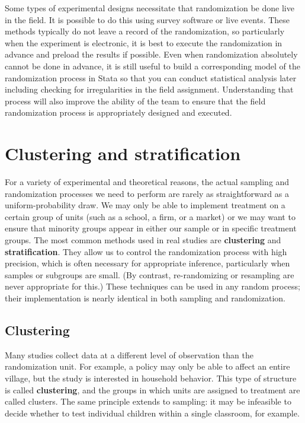 Some types of experimental designs necessitate that randomization be done live in the field.
It is possible to do this using survey software or live events.
These methods typically do not leave a record of the randomization,
so particularly when the experiment is electronic,
it is best to execute the randomization in advance and preload the results if possible.
Even when randomization absolutely cannot be done in advance, it is still useful
to build a corresponding model of the randomization process in Stata
so that you can conduct statistical analysis later
including checking for irregularities in the field assignment.
Understanding that process will also improve the ability of the team
to ensure that the field randomization process is appropriately designed and executed.


\section{Clustering and stratification}

For a variety of experimental and theoretical reasons,
the actual sampling and randomization processes we need to perform
are rarely as straightforward as a uniform-probability draw.
We may only be able to implement treatment on a certain group of units
(such as a school, a firm, or a market)
or we may want to ensure that minority groups appear
in either our sample or in specific treatment groups.
The most common methods used in real studies are \textbf{clustering} and \textbf{stratification}.
They allow us to control the randomization process with high precision,
which is often necessary for appropriate inference,
particularly when samples or subgroups are small.\cite{athey2017econometrics}
(By contrast, re-randomizing or resampling are never appropriate for this.)
These techniques can be used in any random process;
their implementation is nearly identical in both sampling and randomization.

\subsection{Clustering}

Many studies collect data at a different level of observation than the randomization unit.
For example, a policy may only be able to affect an entire village,
but the study is interested in household behavior.
This type of structure is called \textbf{clustering},
and the groups in which units are assigned to treatment are called clusters.
The same principle extends to sampling:
it may be infeasible to decide whether to test individual children
within a single classroom, for example.

